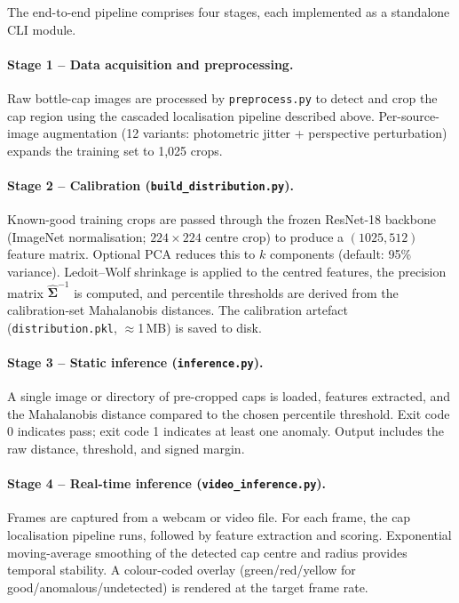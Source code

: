 The end-to-end pipeline comprises four stages, each implemented as a
standalone CLI module.

\paragraph{Stage 1 -- Data acquisition and preprocessing.}
Raw bottle-cap images are processed by \texttt{preprocess.py} to detect
and crop the cap region using the cascaded localisation pipeline described
above. Per-source-image augmentation (12 variants: photometric jitter +
perspective perturbation) expands the training set to 1,025 crops.

\paragraph{Stage 2 -- Calibration (\texttt{build\_distribution.py}).}
Known-good training crops are passed through the frozen ResNet-18 backbone
(ImageNet normalisation; $224\times224$ centre crop) to produce a
$(1025,512)$ feature matrix. Optional PCA reduces this to $k$ components
(default: 95\% variance). Ledoit--Wolf shrinkage is applied to the centred
features, the precision matrix $\hat{\boldsymbol{\Sigma}}^{-1}$ is
computed, and percentile thresholds are derived from the calibration-set
Mahalanobis distances. The calibration artefact (\texttt{distribution.pkl},
$\approx$1\,MB) is saved to disk.

\paragraph{Stage 3 -- Static inference (\texttt{inference.py}).}
A single image or directory of pre-cropped caps is loaded, features
extracted, and the Mahalanobis distance compared to the chosen percentile
threshold. Exit code 0 indicates pass; exit code 1 indicates at least one
anomaly. Output includes the raw distance, threshold, and signed margin.

\paragraph{Stage 4 -- Real-time inference (\texttt{video\_inference.py}).}
Frames are captured from a webcam or video file. For each frame, the cap
localisation pipeline runs, followed by feature extraction and scoring.
Exponential moving-average smoothing of the detected cap centre and radius
provides temporal stability. A colour-coded overlay (green/red/yellow for
good/anomalous/undetected) is rendered at the target frame rate.

